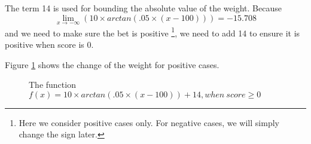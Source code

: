 \documentclass[10pt]{article}
\begin{document}
The term 14 is used for bounding the absolute value of the weight. Because 
$$
\lim_{x \to -\infty} (10\times arctan(.05\times (x - 100))) = -15.708
$$ and we need to make sure the bet is positive \footnote{Here we consider positive cases only. For negative cases, we will simply change the sign later.}, we need to add 14 to ensure it is positive when score is 0.

Figure \ref{figure:a} shows the change of the weight for positive cases.

\begin{figure}
\centering
{}
\caption{The function $f(x)=10\times arctan(.05\times (x - 100)) + 14, when\ score\geq 0$}
\label{figure:a}
\end{figure}


%
%
\end{document}
